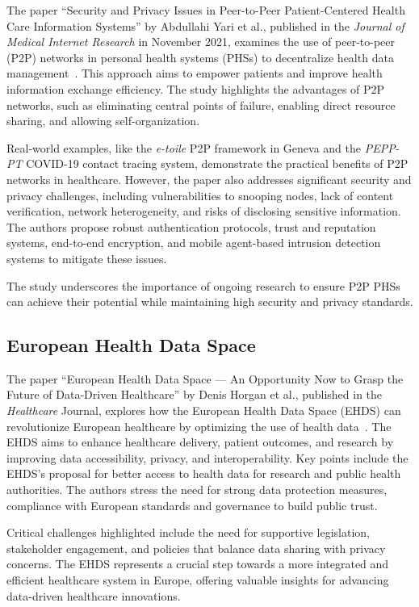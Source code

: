 The paper ``Security and Privacy Issues in Peer-to-Peer Patient-Centered Health Care Information Systems'' by Abdullahi Yari et al., published in the \textit{Journal of Medical Internet Research} in November 2021, examines the use of peer-to-peer (P2P) networks in personal health systems (PHSs) to decentralize health data management~\cite{security_engineering_p2p_environments}.
This approach aims to empower patients and improve health information exchange efficiency.
The study highlights the advantages of P2P networks, such as eliminating central points of failure, enabling direct resource sharing, and allowing self-organization.

Real-world examples, like the \textit{e-toile} P2P framework in Geneva and the \textit{PEPP-PT} COVID-19 contact tracing system, demonstrate the practical benefits of P2P networks in healthcare.
However, the paper also addresses significant security and privacy challenges, including vulnerabilities to snooping nodes, lack of content verification, network heterogeneity, and risks of disclosing sensitive information.
The authors propose robust authentication protocols, trust and reputation systems, end-to-end encryption, and mobile agent-based intrusion detection systems to mitigate these issues.

The study underscores the importance of ongoing research to ensure P2P PHSs can achieve their potential while maintaining high security and privacy standards.

\subsection{European Health Data Space}\label{subsec:european-health-data-space}

The paper ``European Health Data Space --- An Opportunity Now to Grasp the Future of Data-Driven Healthcare'' by Denis Horgan et al., published in the \textit{Healthcare} Journal, explores how the European Health Data Space (EHDS) can revolutionize European healthcare by optimizing the use of health data~\cite{european_health_data_space}.
The EHDS aims to enhance healthcare delivery, patient outcomes, and research by improving data accessibility, privacy, and interoperability.
Key points include the EHDS's proposal for better access to health data for research and public health authorities.
The authors stress the need for strong data protection measures, compliance with European standards and governance to build public trust.

Critical challenges highlighted include the need for supportive legislation, stakeholder engagement, and policies that balance data sharing with privacy concerns.
The EHDS represents a crucial step towards a more integrated and efficient healthcare system in Europe, offering valuable insights for advancing data-driven healthcare innovations.

